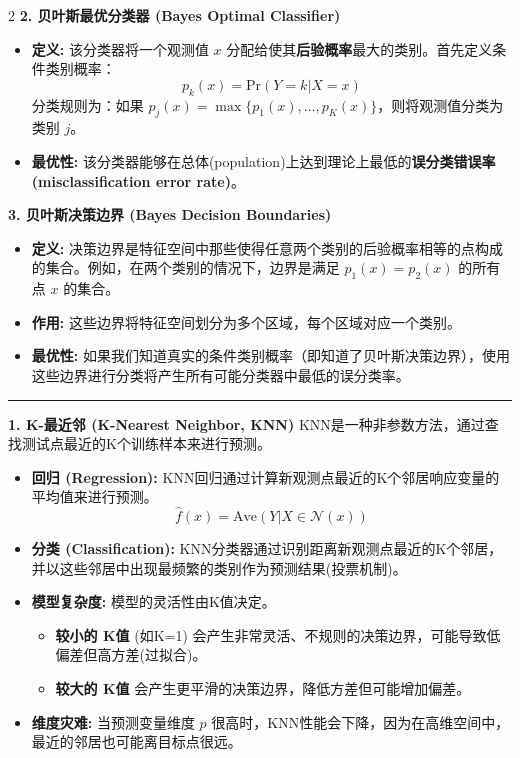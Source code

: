 \documentclass[9pt,a4paper]{article} %
\newcommand{\mysection}[1]{\vspace{0.5em}\hrule\vspace{0.3em}\noindent\textbf{\large #1}\vspace{0.1em}}
\begin{document}
\begin{multicols}{2}
\textbf{2. 贝叶斯最优分类器 (Bayes Optimal Classifier)}
\begin{itemize}
    \item \textbf{定义:} 该分类器将一个观测值 $x$ 分配给使其\textbf{后验概率}最大的类别。首先定义条件类别概率：
    $$ p_k(x) = \text{Pr}(Y=k|X=x) $$
    分类规则为：如果 $p_j(x) = \max\{p_1(x), \dots, p_K(x)\}$，则将观测值分类为类别 $j$。
    \item \textbf{最优性:} 该分类器能够在总体(population)上达到理论上最低的\textbf{误分类错误率(misclassification error rate)}。
\end{itemize}

\textbf{3. 贝叶斯决策边界 (Bayes Decision Boundaries)}
\begin{itemize}
    \item \textbf{定义:} 决策边界是特征空间中那些使得任意两个类别的后验概率相等的点构成的集合。例如，在两个类别的情况下，边界是满足 $p_1(x) = p_2(x)$ 的所有点 $x$ 的集合。
    \item \textbf{作用:} 这些边界将特征空间划分为多个区域，每个区域对应一个类别。
    \item \textbf{最优性:} 如果我们知道真实的条件类别概率（即知道了贝叶斯决策边界），使用这些边界进行分类将产生所有可能分类器中最低的误分类率。
\end{itemize}





\mysection{1. K-最近邻 (K-Nearest Neighbor, KNN)}
KNN是一种非参数方法，通过查找测试点最近的K个训练样本来进行预测。
\begin{itemize}
    \item \textbf{回归 (Regression):} KNN回归通过计算新观测点最近的K个邻居响应变量的平均值来进行预测。
    $$ \hat{f}(x)=\text{Ave}(Y|X\in\mathcal{N}(x)) $$
    \item \textbf{分类 (Classification):} KNN分类器通过识别距离新观测点最近的K个邻居，并以这些邻居中出现最频繁的类别作为预测结果(投票机制)。
    \item \textbf{模型复杂度:} 模型的灵活性由K值决定。
    \begin{itemize}
        \item \textbf{较小的 K值} (如K=1) 会产生非常灵活、不规则的决策边界，可能导致低偏差但高方差(过拟合)。
        \item \textbf{较大的 K值} 会产生更平滑的决策边界，降低方差但可能增加偏差。
    \end{itemize}
    \item \textbf{维度灾难:} 当预测变量维度 $p$ 很高时，KNN性能会下降，因为在高维空间中，最近的邻居也可能离目标点很远。
\end{itemize}


\end{multicols}
\end{document}
